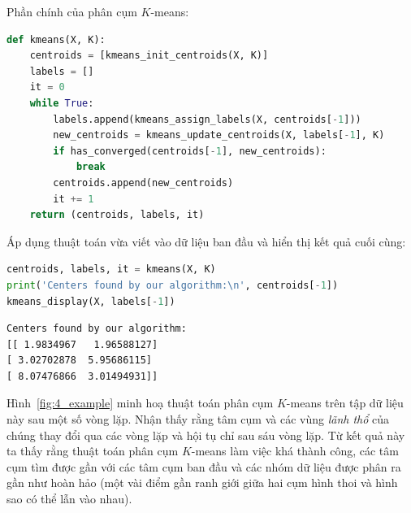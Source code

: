 Phần chính của phân cụm $K$-means:


\begin{lstlisting}[language=Python]
def kmeans(X, K):
    centroids = [kmeans_init_centroids(X, K)]
    labels = []
    it = 0
    while True:
        labels.append(kmeans_assign_labels(X, centroids[-1]))
        new_centroids = kmeans_update_centroids(X, labels[-1], K)
        if has_converged(centroids[-1], new_centroids):
            break
        centroids.append(new_centroids)
        it += 1
    return (centroids, labels, it)
\end{lstlisting}

Áp dụng thuật toán vừa viết vào dữ liệu ban đầu và hiển thị kết quả cuối cùng:


\begin{lstlisting}[language=Python]
centroids, labels, it = kmeans(X, K)
print('Centers found by our algorithm:\n', centroids[-1])
kmeans_display(X, labels[-1])
\end{lstlisting}
\kq
\begin{lstlisting}
Centers found by our algorithm:
[[ 1.9834967   1.96588127]
[ 3.02702878  5.95686115]
[ 8.07476866  3.01494931]]
\end{lstlisting}


Hình~\ref{fig:4_example} minh hoạ thuật toán phân cụm $K$-means trên tập dữ
liệu này sau một số vòng lặp. Nhận thấy rằng tâm cụm và các vùng
\textit{lãnh thổ} của chúng thay đổi qua các vòng lặp và hội tụ chỉ sau sáu vòng
lặp. Từ kết quả này ta thấy rằng thuật toán phân cụm $K$-means làm việc
khá thành công, các tâm cụm tìm được gần với các tâm cụm ban đầu và các nhóm
dữ liệu được phân ra gần như hoàn hảo (một vài điểm gần ranh giới giữa hai
cụm hình thoi và hình sao có thể lẫn vào nhau).


